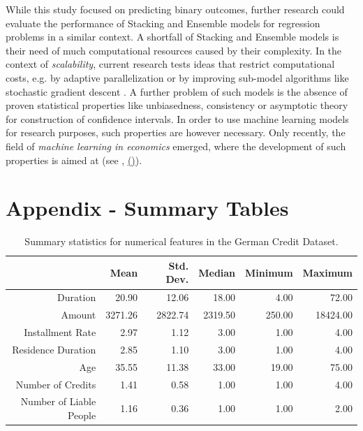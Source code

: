 \documentclass[12pt]{article}
\begin{document}
While this study focused on predicting binary outcomes, further research could evaluate the performance of Stacking and Ensemble models for regression problems in a similar context. A shortfall of Stacking and Ensemble models is their need of much computational resources caused by their complexity. In the context of \textit{scalability}, current research tests ideas that restrict computational costs, e.g. by adaptive parallelization \citep{li2014communication} or by improving sub-model algorithms like stochastic gradient descent \citep{bottou2012stochastic}. A further problem of such models is the absence of proven statistical properties like unbiasedness, consistency or asymptotic theory for construction of confidence intervals. In order to use machine learning models for research purposes, such properties are however necessary. Only recently, the field of \textit{machine learning in economics} emerged, where the development of such properties is aimed at (see \cite{athey2017impact} ,\citeauthor{wager2018est} \hyperlink{wager2018est}{(\color{DarkBlue}{in press})}).  







\newpage
\appendix
\section{Appendix - Summary Tables}

\begin{table}[ht]
\centering
\begin{tabular}{rrrrrr}
  \hline
 & Mean & Std. Dev. & Median & Minimum & Maximum \\ 
  \hline
Duration & 20.90 & 12.06 & 18.00 & 4.00 & 72.00 \\ 
  Amount & 3271.26 & 2822.74 & 2319.50 & 250.00 & 18424.00 \\ 
  Installment Rate & 2.97 & 1.12 & 3.00 & 1.00 & 4.00 \\ 
  Residence Duration & 2.85 & 1.10 & 3.00 & 1.00 & 4.00 \\ 
  Age & 35.55 & 11.38 & 33.00 & 19.00 & 75.00 \\ 
  Number of Credits & 1.41 & 0.58 & 1.00 & 1.00 & 4.00 \\ 
  Number of Liable People & 1.16 & 0.36 & 1.00 & 1.00 & 2.00 \\ 
   \hline
\end{tabular}
\caption[Summary statistics for numerical features]{Summary statistics for numerical features in the German Credit Dataset.}\label{summary_numeric}
\end{table}
\end{document}
